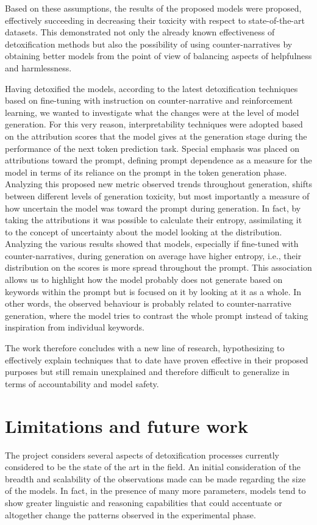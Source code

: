 Based on these assumptions, the results of the proposed models were proposed, effectively succeeding in decreasing their toxicity with respect to state-of-the-art datasets. This demonstrated not only the already known effectiveness of detoxification methods but also the possibility of using counter-narratives by obtaining better models from the point of view of balancing aspects of helpfulness and harmlessness.

Having detoxified the models, according to the latest detoxification techniques based on fine-tuning with instruction on counter-narrative and reinforcement learning, we wanted to investigate what the changes were at the level of model generation. For this very reason, interpretability techniques were adopted based on the attribution scores that the model gives at the generation stage during the performance of the next token prediction task. Special emphasis was placed on attributions toward the prompt, defining prompt dependence as a measure for the model in terms of its reliance on the prompt in the token generation phase. Analyzing this proposed new metric observed trends throughout generation, shifts between different levels of generation toxicity, but most importantly a measure of how uncertain the model was toward the prompt during generation. In fact, by taking the attributions it was possible to calculate their entropy, assimilating it to the concept of uncertainty about the model looking at the distribution. Analyzing the various results showed that models, especially if fine-tuned with counter-narratives, during generation on average have higher entropy, i.e., their distribution on the scores is more spread throughout the prompt. This association allows us to highlight how the model probably does not generate based on keywords within the prompt but is focused on it by looking at it as a whole. In other words, the observed behaviour is probably related to counter-narrative generation, where the model tries to contrast the whole prompt instead of taking inspiration from individual keywords.

The work therefore concludes with a new line of research, hypothesizing to effectively explain techniques that to date have proven effective in their proposed purposes but still remain unexplained and therefore difficult to generalize in terms of accountability and model safety.


\section {Limitations and future work}
The project considers several aspects of detoxification processes currently considered to be the state of the art in the field. An initial consideration of the breadth and scalability of the observations made can be made regarding the size of the models. In fact, in the presence of many more parameters, models tend to show greater linguistic and reasoning capabilities that could accentuate or altogether change the patterns observed in the experimental phase. 

